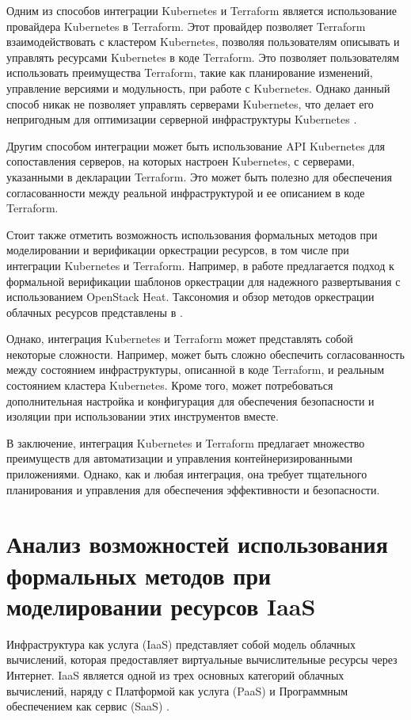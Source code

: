 Одним из способов интеграции Kubernetes и Terraform является использование
провайдера Kubernetes в Terraform. Этот провайдер позволяет Terraform
взаимодействовать с кластером Kubernetes, позволяя пользователям описывать
и управлять ресурсами Kubernetes в коде Terraform. Это позволяет
пользователям использовать преимущества Terraform, такие как планирование
изменений, управление версиями и модульность, при работе с Kubernetes.
Однако данный способ никак не позволяет управлять серверами
Kubernetes, что делает его непригодным для оптимизации серверной
инфраструктуры Kubernetes \cite{davis2021bootstrapping}.

Другим способом интеграции может быть использование API Kubernetes
для сопоставления серверов, на которых настроен Kubernetes, с серверами,
указанными в декларации Terraform. Это может быть полезно для обеспечения
согласованности между реальной инфраструктурой и ее описанием в коде
Terraform.

Стоит также отметить возможность использования формальных методов при моделировании 
и верификации оркестрации ресурсов, в том числе при интеграции Kubernetes и Terraform. 
Например, в работе \cite{sylla2019formal} предлагается подход к формальной верификации шаблонов 
оркестрации для надежного развертывания с использованием OpenStack Heat. 
Таксономия и обзор методов оркестрации облачных ресурсов представлены в \cite{weerasiri2017taxonomy}.

Однако, интеграция Kubernetes и Terraform может представлять собой
некоторые сложности. Например, может быть сложно обеспечить согласованность
между состоянием инфраструктуры, описанной в коде Terraform,
и реальным состоянием кластера Kubernetes. Кроме того, может
потребоваться дополнительная настройка и конфигурация для обеспечения
безопасности и изоляции при использовании этих инструментов вместе.

В заключение, интеграция Kubernetes и Terraform предлагает множество
преимуществ для автоматизации и управления контейнеризированными
приложениями. Однако, как и любая интеграция, она требует тщательного
планирования и управления для обеспечения эффективности и безопасности.

\section{Анализ возможностей использования формальных методов при
моделировании ресурсов IaaS}
Инфраструктура как услуга (IaaS) представляет собой модель облачных
вычислений, которая предоставляет виртуальные вычислительные ресурсы
через Интернет. IaaS является одной из трех основных категорий облачных
вычислений, наряду с Платформой как услуга (PaaS) и Программным обеспечением
как сервис (SaaS) \cite{iaas2017}.

